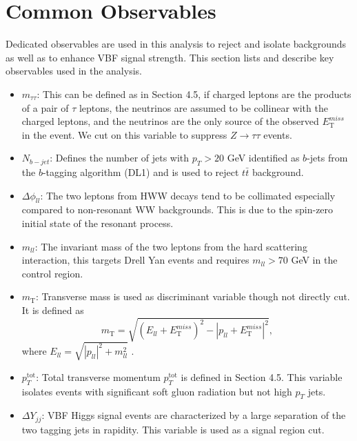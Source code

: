 \section{Common Observables}

Dedicated observables are used in this analysis to reject and isolate backgrounds as well as to enhance VBF signal strength. This section lists and describe key observables used in the analysis.

\begin{itemize}
\item $m_{\tau \tau}$: This can be defined as in Section 4.5, if charged leptons are the products of a pair of $\tau$ leptons, the neutrinos are assumed to be collinear with the charged leptons, and the neutrinos are the only source of the observed $E_\mathrm{{T}}^{miss}$ in the event. We cut on this variable to suppress $Z\rightarrow\tau\tau$  events. 
\item $N_{b-jet}$: Defines the number of jets with $p_T >20$ GeV identified as $b$-jets from the $b$-tagging algorithm (DL1) and is used to reject $t\bar{t}$ background.
\item $\Delta \phi_{ll}$: The two leptons from HWW decays tend to be collimated especially compared to non-resonant WW backgrounds. This is due to the spin-zero initial state of the resonant process. 
\item $m_{ll}$: The invariant mass of the two leptons from the hard scattering interaction, this targets Drell Yan events and requires $m_{ll}>70$ GeV in the control region.
\item $m_\mathrm{{T}}$: Transverse mass is used as discriminant variable though not directly cut. It is defined as
\begin{equation}
m_\mathrm{{T}} = \sqrt{ {(E_{ll} + E_\mathrm{{T}}^{miss})}^2 - {|p_{ll} + E_\mathrm{{T}}^{miss}|}^2 },
\end{equation}
  where $E_{ll} = \sqrt{|p_{ll}|^2 + m_{ll}^2 }$ .
\item $p_T^\mathrm{tot}$:
Total transverse momentum $p_T^\mathrm{tot}$ is defined in Section 4.5. This variable isolates events with significant soft gluon radiation but not high $p_T$ jets.
\item  $\Delta Y_{jj}$: VBF Higgs signal events are characterized by a large separation of the two tagging jets in rapidity. This variable is used as a signal region cut. 

\end{itemize}
